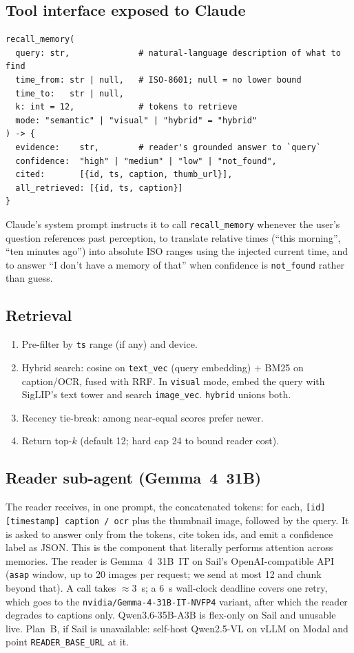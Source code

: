 \documentclass[11pt,a4paper]{article}
\begin{document}
\subsection{Tool interface exposed to Claude}
\begin{lstlisting}
recall_memory(
  query: str,              # natural-language description of what to find
  time_from: str | null,   # ISO-8601; null = no lower bound
  time_to:   str | null,
  k: int = 12,             # tokens to retrieve
  mode: "semantic" | "visual" | "hybrid" = "hybrid"
) -> {
  evidence:    str,        # reader's grounded answer to `query`
  confidence:  "high" | "medium" | "low" | "not_found",
  cited:       [{id, ts, caption, thumb_url}],
  all_retrieved: [{id, ts, caption}]
}
\end{lstlisting}
Claude's system prompt instructs it to call \texttt{recall\_memory} whenever the user's question references past perception, to translate relative times (``this morning'', ``ten minutes ago'') into absolute ISO ranges using the injected current time, and to answer ``I don't have a memory of that'' when confidence is \texttt{not\_found} rather than guess.

\subsection{Retrieval}
\begin{enumerate}
  \item Pre-filter by \texttt{ts} range (if any) and device.
  \item Hybrid search: cosine on \texttt{text\_vec} (query embedding) $+$ BM25 on caption/OCR, fused with RRF. In \texttt{visual} mode, embed the query with SigLIP's text tower and search \texttt{image\_vec}. \texttt{hybrid} unions both.
  \item Recency tie-break: among near-equal scores prefer newer.
  \item Return top-$k$ (default 12; hard cap 24 to bound reader cost).
\end{enumerate}

\subsection{Reader sub-agent (Gemma~4~31B)}
The reader receives, in one prompt, the concatenated tokens: for each, \texttt{[id] [timestamp] caption / ocr} plus the thumbnail image, followed by the query. It is asked to answer only from the tokens, cite token ids, and emit a confidence label as JSON. This is the component that literally performs attention across memories. The reader is Gemma~4~31B~IT on Sail's OpenAI-compatible API (\texttt{asap} window, up to 20 images per request; we send at most 12 and chunk beyond that). A call takes $\approx$3~s; a 6~s wall-clock deadline covers one retry, which goes to the \texttt{nvidia/Gemma-4-31B-IT-NVFP4} variant, after which the reader degrades to captions only. Qwen3.6-35B-A3B is flex-only on Sail and unusable live. Plan~B, if Sail is unavailable: self-host Qwen2.5-VL on vLLM on Modal and point \texttt{READER\_BASE\_URL} at it.
\end{document}
